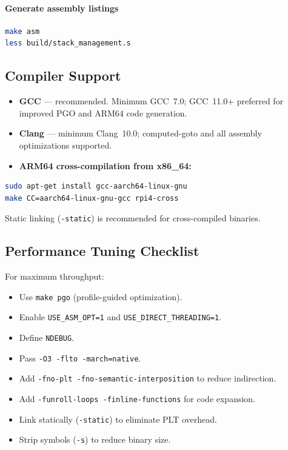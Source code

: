 \paragraph{Generate assembly listings}
\begin{lstlisting}[language=bash]
make asm
less build/stack_management.s
\end{lstlisting}

\subsection{Compiler Support}
\label{sec:build-compilers}

\begin{itemize}
  \item \textbf{GCC} — recommended. Minimum GCC~7.0; GCC~11.0+ preferred for improved PGO and ARM64 code generation.
  \item \textbf{Clang} — minimum Clang~10.0; computed-goto and all assembly optimizations supported.
  \item \textbf{ARM64 cross-compilation from x86\_64:}
\end{itemize}

\begin{lstlisting}[language=bash]
sudo apt-get install gcc-aarch64-linux-gnu
make CC=aarch64-linux-gnu-gcc rpi4-cross
\end{lstlisting}

Static linking (\texttt{-static}) is recommended for cross-compiled binaries.

\subsection{Performance Tuning Checklist}
\label{sec:build-tuning}

For maximum throughput:

\begin{itemize}
  \item Use \texttt{make pgo} (profile-guided optimization).
  \item Enable \texttt{USE\_ASM\_OPT=1} and \texttt{USE\_DIRECT\_THREADING=1}.
  \item Define \texttt{NDEBUG}.
  \item Pass \texttt{-O3 -flto -march=native}.
  \item Add \texttt{-fno-plt -fno-semantic-interposition} to reduce indirection.
  \item Add \texttt{-funroll-loops -finline-functions} for code expansion.
  \item Link statically (\texttt{-static}) to eliminate PLT overhead.
  \item Strip symbols (\texttt{-s}) to reduce binary size.
\end{itemize}

